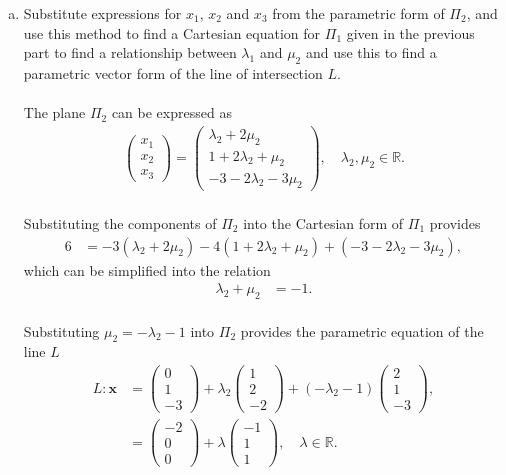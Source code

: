\documentclass{amsart}
\renewcommand{\vec}{\mathbf}
\newcommand{\cvec}[1]{ \begin{pmatrix} #1 \end{pmatrix} }
\begin{document}
\begin{enumerate}[(a)]
			\item Substitute expressions for $x_1$, $x_2$ and $x_3$ from the parametric form of $\Pi_2$, and use this method to find a Cartesian equation for $\Pi_1$ given in the previous part to find a relationship between $\lambda_1$ and $\mu_2$ and use this to find a parametric vector form of the line of intersection $L$.
				\\ \\
				The plane $\Pi_2$ can be expressed as
					\begin{align*}
						\cvec{x_1\\x_2\\x_3} = \cvec{\lambda_2+2\mu_2\\1+2\lambda_2+\mu_2\\-3-2\lambda_2-3\mu_2}, \quad \lambda_2, \mu_2 \in \mathbb{R}.
					\end{align*}
				\\
				Substituting the components of $\Pi_2$ into the Cartesian form of $\Pi_1$ provides
					\begin{align*}
						6 &= -3(\lambda_2 + 2\mu_2) - 4(1 + 2\lambda_2 + \mu_2) + (-3 - 2\lambda_2 - 3\mu_2),
					\end{align*}
				which can be simplified into the relation
					\begin{align*}
						\lambda_2 + \mu_2 &= -1.
					\end{align*}
				\\
				Substituting $\mu_2 = -\lambda_2 - 1$ into $\Pi_2$ provides the parametric equation of the line $L$
					\begin{align*}
						L: \vec{x} &= \cvec{0\\1\\-3} + \lambda_2 \cvec{1\\2\\-2} + (-\lambda_2 - 1)\cvec{2\\1\\-3},		\\
								&= \cvec{-2\\0\\0} + \lambda \cvec{-1\\1\\1}, \quad \lambda \in \mathbb{R}.
					\end{align*}
				\\ 


\end{enumerate}
\end{document}
